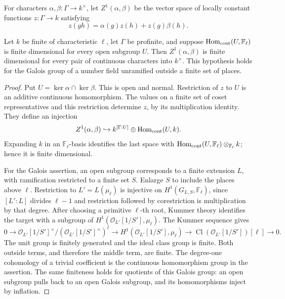 For characters \(\alpha,\beta:\Gamma\to k^\times\), let
\(Z^1(\alpha,\beta)\) be the vector space of locally constant functions
\(z:\Gamma\to k\) satisfying
\[
 z(gh)=\alpha(g)z(h)+z(g)\beta(h).
\]
\begin{srlemma}\label{lem:sr-finite-cross-cocycles}
Let \(k\) be finite of characteristic \(\ell\), let \(\Gamma\) be
profinite, and suppose
\(\operatorname{Hom}_{\rm cont}(U,\mathbb F_\ell)\) is finite
dimensional for every open subgroup \(U\).
Then \(Z^1(\alpha,\beta)\) is finite dimensional for every pair of
continuous characters into \(k^\times\).
This hypothesis holds for the Galois group of a number field
unramified outside a finite set of places.
\end{srlemma}
\begin{proof}
Put \(U=\ker\alpha\cap\ker\beta\). This is open and normal.
Restriction of \(z\) to \(U\) is an additive continuous homomorphism.
The values on a finite set of coset representatives and this restriction
determine \(z\), by its multiplication identity. They define an injection
\[
 Z^1(\alpha,\beta)\hookrightarrow
 k^{[\Gamma:U]}\oplus\operatorname{Hom}_{\rm cont}(U,k).
\]
Expanding \(k\) in an \(\mathbb F_\ell\)-basis identifies the last
space with
\(\operatorname{Hom}_{\rm cont}(U,\mathbb F_\ell)
 \otimes_{\mathbb F_\ell}k\); hence it is finite dimensional.

For the Galois assertion, an open subgroup corresponds to a finite
extension \(L\), with ramification restricted to a finite set \(S\).
Enlarge \(S\) to include the places above \(\ell\).
Restriction to \(L'=L(\mu_\ell)\) is injective on
\(H^1(G_{L,S},\mathbb F_\ell)\), since \([L':L]\) divides
\(\ell-1\) and restriction followed by corestriction is multiplication
by that degree.
After choosing a primitive \(\ell\)-th root, Kummer theory identifies
the target with a subgroup of
\(H^1(\mathcal O_{L'}[1/S'],\mu_\ell)\).
The Kummer sequence gives
\[
 0\longrightarrow
 \mathcal O_{L'}[1/S']^\times/
          (\mathcal O_{L'}[1/S']^\times)^\ell
 \longrightarrow H^1(\mathcal O_{L'}[1/S'],\mu_\ell)
 \longrightarrow \operatorname{Cl}(\mathcal O_{L'}[1/S'])[\ell]
 \longrightarrow0.
\]
The unit group is finitely generated and the ideal class group is finite.
Both outside terms, and therefore the middle term, are finite.
The degree-one cohomology of a trivial coefficient is the continuous
homomorphism group in the assertion. The same finiteness holds for
quotients of this Galois group: an open subgroup pulls back to an open
Galois subgroup, and its homomorphisms inject by inflation.
\end{proof}

